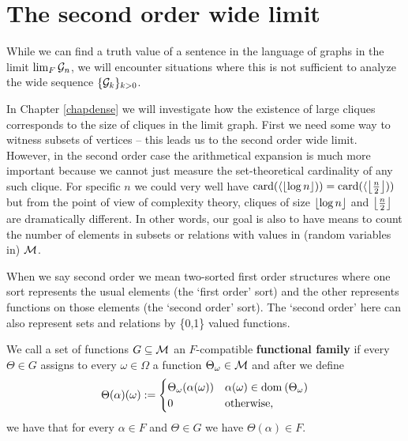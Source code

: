 \section{The second order wide limit}

While we can find a truth value of a sentence in the language of graphs in the limit $\lim_{F}\mathcal{G}_n$, we will encounter situations where this is not sufficient to analyze the wide sequence $\{\mathcal{G}_k\}_{k>0}$. 

In Chapter \ref{chapdense} we will investigate how the existence of large cliques corresponds to the size of cliques in the limit graph. First we need some way to witness subsets of vertices -- this leads us to the second order wide limit. However, in the second order case the arithmetical expansion is much more important because we cannot just measure the set-theoretical cardinality of any such clique. For specific $n$ we could very well have $\text{card}(\langle \left \lfloor {\log{n}} \right \rfloor))=\text{card}(\langle \left \lfloor {\frac{n}{2}} \right \rfloor))$ but from the point of view of complexity theory, cliques of size $\left \lfloor {\log n} \right \rfloor$ and $\left \lfloor {\frac{n}{2}} \right \rfloor$ are dramatically different. In other words, our goal is also to have means to count the number of elements in subsets or relations with values in (random variables in) $\mathcal{M}$.

When we say second order we mean two-sorted first order structures where one sort represents the usual elements (the `first order' sort) and the other represents functions on those elements (the `second order' sort). The `second order' here can also represent sets and relations by \{0,1\} valued functions.

\begin{defi}
We call a set of functions $G\subseteq \mathcal{M}$ an $F$-compatible \textbf{functional family} if every $\Theta\in G$ assigns to every $\omega\in\Omega$ a function $\Theta_\omega\in\mathcal{M}$ and after we define
\[\Theta(\alpha)(\omega):=
\begin{cases}\Theta_\omega(\alpha(\omega))&\alpha(\omega)\in\text{dom}\:(\Theta_\omega)\\0&\text{otherwise,}
\end{cases}\]
we have that for every $\alpha \in F$ and $\Theta \in G$ we have $\Theta(\alpha)\in F$.
\end{defi}

